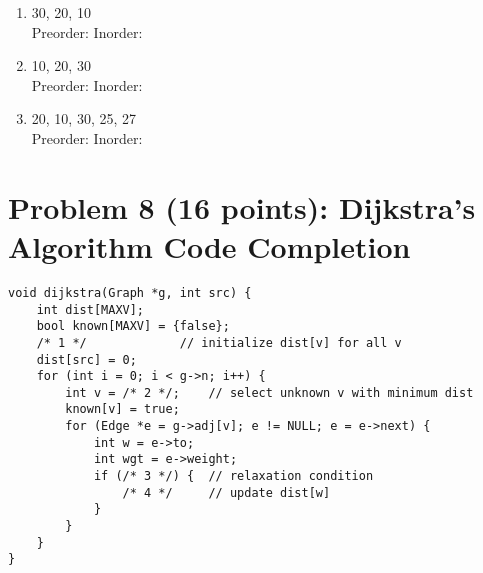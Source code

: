 \documentclass[12pt]{article}
\begin{document}
\begin{enumerate}[label=\alph*)]
\item 30, 20, 10\\
Preorder: \underline{\hspace{2in}} \quad Inorder: \underline{\hspace{2in}} \\
\item 10, 20, 30\\
Preorder: \underline{\hspace{2in}} \quad Inorder: \underline{\hspace{2in}} \\
\item 20, 10, 30, 25, 27\\
Preorder: \underline{\hspace{2in}} \quad Inorder: \underline{\hspace{2in}} \\
\end{enumerate}

\newpage

\section*{Problem 8 (16 points): Dijkstra's Algorithm Code Completion}
\begin{verbatim}
void dijkstra(Graph *g, int src) {
    int dist[MAXV];
    bool known[MAXV] = {false};
    /* 1 */             // initialize dist[v] for all v
    dist[src] = 0;
    for (int i = 0; i < g->n; i++) {
        int v = /* 2 */;    // select unknown v with minimum dist
        known[v] = true;
        for (Edge *e = g->adj[v]; e != NULL; e = e->next) {
            int w = e->to;
            int wgt = e->weight;
            if (/* 3 */) {  // relaxation condition
                /* 4 */     // update dist[w]
            }
        }
    }
}
\end{verbatim}
\end{document}
